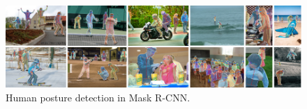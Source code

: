 \begin{figure}[!h]
	\centering
	\includegraphics[width=\fig\textwidth]{5-03.pdf}
    \caption[Human posture detection in Mask R-CNN]{Human posture detection in Mask R-CNN.}
	\label{fig:posdet}
\end{figure}